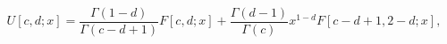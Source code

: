 \begin{equation}
U[c,d;x]=\frac{\Gamma(1-d)}{\Gamma(c-d+1)}F[c,d;x]+\frac{\Gamma(
d-1)}{\Gamma(c)}x^{1-d}F[c-d+1,2-d;x],
\label{prop}
\end{equation}

